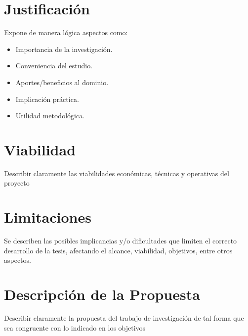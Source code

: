 \section{Justificación}
Expone de manera lógica aspectos como:

\begin{itemize}
    \item Importancia de la investigación.
    \item Conveniencia del estudio.
    \item Aportes/beneficios al dominio.
    \item Implicación práctica.
    \item Utilidad metodológica.
\end{itemize}

\section{Viabilidad}

Describir claramente las viabilidades económicas, técnicas y operativas del proyecto

\section{Limitaciones}

Se describen las posibles implicancias y/o dificultades que limiten el correcto desarrollo de la tesis, afectando el alcance, viabilidad, objetivos, entre otros aspectos.

\section{Descripción de la Propuesta}

Describir claramente la propuesta del trabajo de investigación de tal forma que sea congruente con lo indicado en los objetivos
